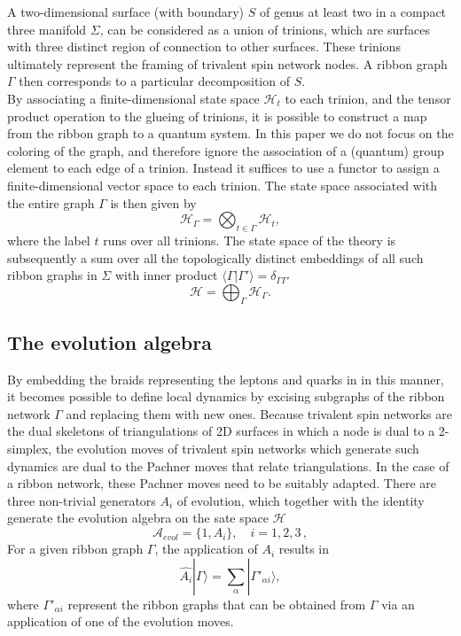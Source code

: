 \documentclass[aps,nofootinbib,amsfonts,superscriptaddress]{revtex4}
\begin{document}
A two-dimensional surface (with boundary) $S$ of genus at least two in a compact three manifold $\Sigma$, can be considered as a union of trinions, which are surfaces with three distinct region of connection to other surfaces. These trinions ultimately represent the framing of trivalent spin network nodes. A ribbon graph $\Gamma$ then corresponds to a particular decomposition of $S$. \\

By associating a finite-dimensional state space $\mathcal{H}_{t}$ to each trinion, and the tensor product operation to the glueing of trinions, it is possible to construct a map from the ribbon graph to a quantum system. In this paper we do not focus on the coloring of the graph, and therefore ignore the association of a (quantum) group element to each edge of a trinion. Instead it suffices to use a functor to assign a finite-dimensional vector space to each trinion. The state space associated with the entire graph $\Gamma$ is then given by
\begin{equation}
    \mathcal{H}_{\Gamma}=\bigotimes_{t\in\Gamma} \mathcal{H}_t,
\end{equation}
where the label $t$ runs over all trinions. The state space of the theory is subsequently a sum over all the topologically distinct embeddings of all such ribbon graphs in $\Sigma$ with inner product $\langle \Gamma | \Gamma' \rangle=\delta_{\Gamma\Gamma'}$
\begin{equation}
    \mathcal{H}=\bigoplus_{\Gamma}\mathcal{H}_{\Gamma}.
\end{equation}

\subsection{The evolution algebra}

By embedding the braids representing the leptons and quarks in \cite{BT} in this manner, it becomes possible to define local dynamics by excising subgraphs of the ribbon network $\Gamma$ and replacing them with new ones. Because trivalent spin networks are the dual skeletons of triangulations of 2D surfaces in which a node is dual to a 2-simplex, the evolution moves of trivalent spin networks which generate such dynamics are dual to the Pachner moves that relate triangulations. In the case of a ribbon network, these Pachner moves need to be suitably adapted. There are three non-trivial generators $A_i$ of evolution, which together with the identity generate the evolution algebra on the sate space $\mathcal{H}$
\begin{equation}
    \mathcal{A}_{evol}=\{1, A_i\},\quad i=1,2,3\,,
\end{equation}
For a given ribbon graph $\Gamma$, the application of $A_i$ results in
\begin{equation}
    \hat{A_i}|\Gamma \rangle=\sum_\alpha |\Gamma'_{\alpha i}\rangle,
\end{equation}
where $\Gamma'_{\alpha i}$ represent the ribbon graphs that can be obtained from $\Gamma$ via an application of one of the evolution moves. \\
\end{document}
